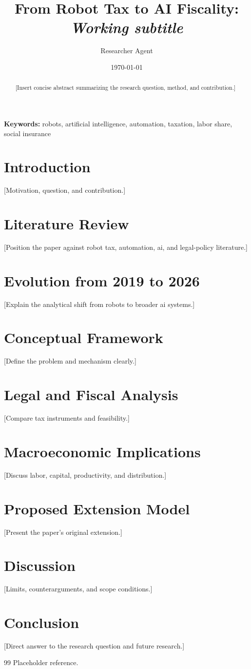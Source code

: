 \documentclass[11pt]{article}
\title{From Robot Tax to AI Fiscality: \textit{Working subtitle}}
\author{Researcher Agent}
\date{\today}
\begin{document}
\maketitle

\begin{abstract}
[Insert concise abstract summarizing the research question, method, and contribution.]
\end{abstract}

\noindent\textbf{Keywords:} robots, artificial intelligence, automation, taxation, labor share, social insurance

\section{Introduction}
[Motivation, question, and contribution.]

\section{Literature Review}
[Position the paper against robot tax, automation, ai, and legal-policy literature.]

\section{Evolution from 2019 to 2026}
[Explain the analytical shift from robots to broader ai systems.]

\section{Conceptual Framework}
[Define the problem and mechanism clearly.]

\section{Legal and Fiscal Analysis}
[Compare tax instruments and feasibility.]

\section{Macroeconomic Implications}
[Discuss labor, capital, productivity, and distribution.] 

\section{Proposed Extension Model}
[Present the paper's original extension.] 

\section{Discussion}
[Limits, counterarguments, and scope conditions.] 

\section{Conclusion}
[Direct answer to the research question and future research.] 


\begin{thebibliography}{99}
 Placeholder reference.
\end{thebibliography}
\end{document}
